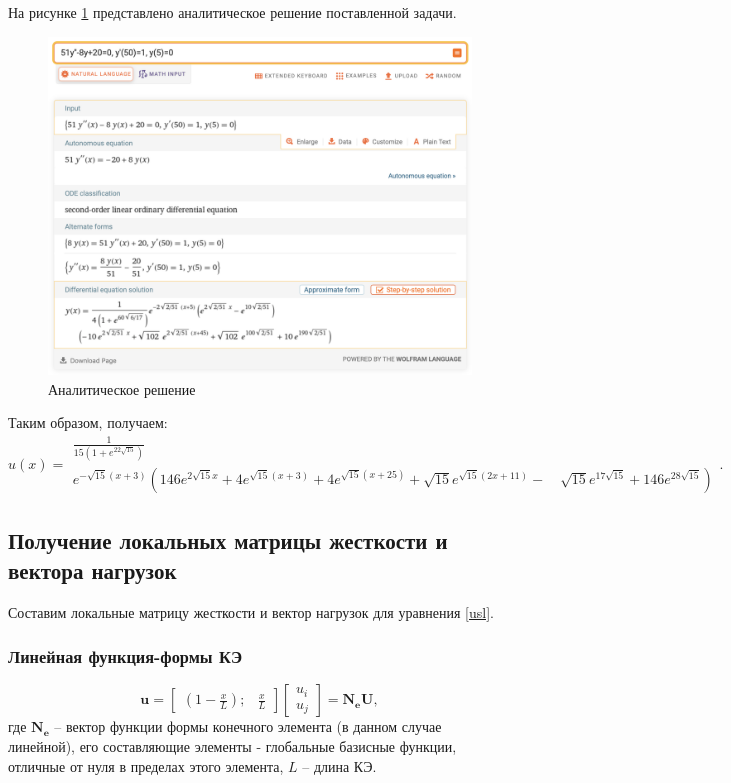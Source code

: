 На рисунке \ref{analit} представлено аналитическое решение поставленной задачи.
\begin{figure}[!h]
\begin{center}
\includegraphics[scale = 0.5]{labs/img/img1}
\end{center}
\caption{Аналитическое решение}
\label{analit}
\end{figure}

Таким образом, получаем:
$$
u(x)=\begin{multline}\frac{1}{15\left(1+e^{22 \sqrt{15}}\right)} \\ e^{-\sqrt{15}(x+3)}\left(146 e^{2 \sqrt{15} x}+4 e^{\sqrt{15}(x+3)}+4 e^{\sqrt{15}(x+25)}+\sqrt{15} e^{\sqrt{15}(2 x+11)}-\right. \left.\quad \sqrt{15} e^{17 \sqrt{15}}+146 e^{28 \sqrt{15}}\right)\end{multline}.
$$


\subsection{Получение локальных матрицы жесткости и вектора нагрузок}

Составим локальные матрицу жесткости и вектор нагрузок для уравнения \ref{usl}.

\subsubsection{Линейная функция-формы КЭ}

$$
\mathbf{u}=\begin{bmatrix}
(1-\frac{x}{L}) ; & \frac{x}{L}
\end{bmatrix}
\begin{bmatrix}
u_i \\
u_j
\end{bmatrix}
=\mathbf{N_eU},
$$
где $\mathbf{N_e}$ -- вектор функции формы конечного элемента (в данном случае линейной), его составляющие элементы - глобальные базисные функции, отличные от нуля в пределах этого элемента, $L$ -- длина КЭ.

